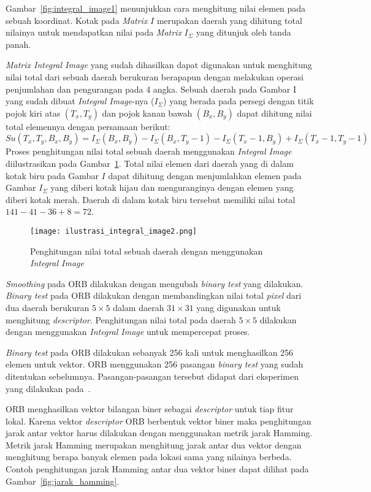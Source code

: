 Gambar~\ref{fig:integral_image1} menunjukkan cara menghitung nilai elemen pada sebuah koordinat. Kotak pada \textit{Matrix} $I$ merupakan daerah yang dihitung total nilainya untuk mendapatkan nilai pada \textit{Matrix} $I_\Sigma$ yang ditunjuk oleh tanda panah. 

\textit{Matrix Integral Image} yang sudah dihasilkan dapat digunakan untuk menghitung nilai total dari sebuah daerah berukuran berapapun dengan melakukan operasi penjumlahan dan pengurangan pada 4 angka. Sebuah daerah pada Gambar I yang sudah dibuat \textit{Integral Image}-nya ($I_\Sigma$) yang berada pada persegi dengan titik pojok kiri atas $(T_x, T_y)$ dan pojok kanan bawah $(B_x, B_y)$ dapat dihitung nilai total elemennya dengan persamaan berikut:
\begin{equation}
	Su(T_x, T_y, B_x, B_y) = I_\Sigma(B_x, B_y) - I_\Sigma(B_x, T_y-1) - I_\Sigma(T_x-1, B_y) + I_\Sigma(T_x-1,T_y-1)
\end{equation}
Proses penghitungan nilai total sebuah daerah menggunakan \textit{Integral Image} diilustrasikan pada Gambar~\ref{fig:integral_image2}. Total nilai elemen dari daerah yang di dalam kotak biru pada Gambar $I$ dapat dihitung dengan menjumlahkan elemen pada Gambar $I_\Sigma$ yang diberi kotak hijau dan menguranginya dengan elemen yang diberi kotak merah. Daerah di dalam kotak biru tersebut memiliki nilai total $141-41-36+8=72$.
\begin{figure}[H]
	\centering
	\texttt{[image: ilustrasi\_integral\_image2.png]}
	\caption{Penghitungan nilai total sebuah daerah dengan menggunakan \textit{Integral Image}}
	\label{fig:integral_image2}
\end{figure}

\textit{Smoothing} pada ORB dilakukan dengan mengubah \textit{binary test} yang dilakukan. \textit{Binary test} pada ORB dilakukan dengan membandingkan nilai total \textit{pixel} dari dua daerah berukuran $5\times5$ dalam daerah $31\times31$ yang digunakan untuk menghitung \textit{descriptor}. Penghitungan nilai total pada daerah $5\times5$ dilakukan dengan menggunakan \textit{Integral Image} untuk mempercepat proses. 

\textit{Binary test} pada ORB dilakukan sebanyak 256 kali untuk menghasilkan 256 elemen untuk vektor. ORB menggunakan 256 pasangan \textit{binary test} yang sudah ditentukan sebelumnya. Pasangan-pasangan tersebut didapat dari eksperimen yang dilakukan pada~\cite{rublee2011orb}.

ORB menghasilkan vektor bilangan biner sebagai \textit{descriptor} untuk tiap fitur lokal. Karena vektor \textit{descriptor} ORB berbentuk vektor biner maka penghitungan jarak antar vektor harus dilakukan dengan menggunakan metrik jarak Hamming. Metrik jarak Hamming merupakan menghitung jarak antar dua vektor dengan menghitung berapa banyak elemen pada lokasi sama yang nilainya berbeda. Contoh penghitungan jarak Hamming antar dua vektor biner dapat dilihat pada Gambar~\ref{fig:jarak_hamming}.

